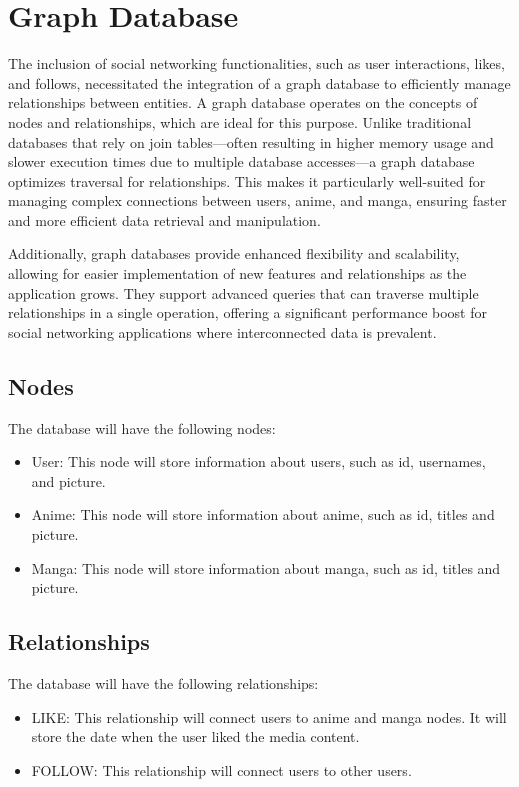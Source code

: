 \newpage

\section*{Graph Database}

The inclusion of social networking functionalities, such as user interactions, likes, and follows, necessitated the 
integration of a graph database to efficiently manage relationships between entities. A graph database operates on 
the concepts of nodes and relationships, which are ideal for this purpose. Unlike traditional databases that rely on 
join tables—often resulting in higher memory usage and slower execution times due to multiple database accesses—a graph 
database optimizes traversal for relationships. This makes it particularly well-suited for managing complex connections 
between users, anime, and manga, ensuring faster and more efficient data retrieval and manipulation.

\vspace{\baselineskip}

Additionally, graph databases provide enhanced flexibility and scalability, allowing for easier implementation of 
new features and relationships as the application grows. They support advanced queries that can traverse multiple 
relationships in a single operation, offering a significant performance boost for social networking applications 
where interconnected data is prevalent.

\subsection*{Nodes}

The database will have the following nodes:
\begin{itemize}
    \item User: This node will store information about users, such as id, usernames, and picture.
    \item Anime: This node will store information about anime, such as id, titles and picture.
    \item Manga: This node will store information about manga, such as id, titles and picture.
\end{itemize}

\subsection*{Relationships}

The database will have the following relationships:
\begin{itemize}
    \item LIKE\@: This relationship will connect users to anime and manga nodes. It will store the date when the user liked the media content.
    \item FOLLOW\@: This relationship will connect users to other users. 
\end{itemize}

